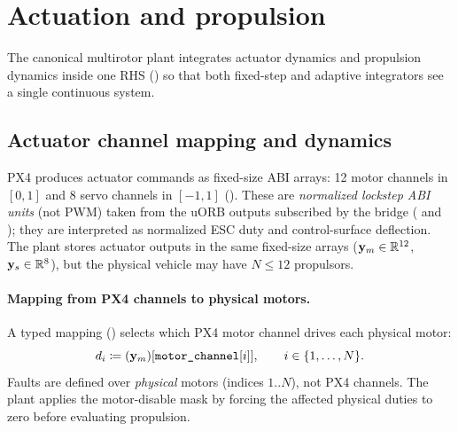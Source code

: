 \section{Actuation and propulsion}
\label{sec:actuation-propulsion}

The canonical multirotor plant integrates actuator dynamics and propulsion dynamics inside one RHS () so that both fixed-step and adaptive integrators see a single continuous system.

\subsection{Actuator channel mapping and dynamics}

PX4 produces actuator commands as fixed-size ABI arrays: 12 motor channels in $[0,1]$ and 8 servo channels in $[-1,1]$ (). These are \emph{normalized lockstep ABI units} (not PWM) taken from the uORB outputs subscribed by the bridge ( and ); they are interpreted as normalized ESC duty and control-surface deflection. The plant stores actuator outputs in the same fixed-size arrays ($\mathbf{y}_m\in\mathbb{R}^{12}$, $\mathbf{y}_s\in\mathbb{R}^{8}$), but the physical vehicle may have $N\le 12$ propulsors.

\paragraph{Mapping from PX4 channels to physical motors.}
A typed mapping () selects which PX4 motor channel drives each physical motor:
\begin{equation}
  d_i \coloneqq (\mathbf{y}_m)[\texttt{motor\_channel}[i]],\qquad i\in\{1,\dots,N\}.
\end{equation}
Faults are defined over \emph{physical} motors (indices $1..N$), not PX4 channels. The plant applies the motor-disable mask by forcing the affected physical duties to zero before evaluating propulsion.

